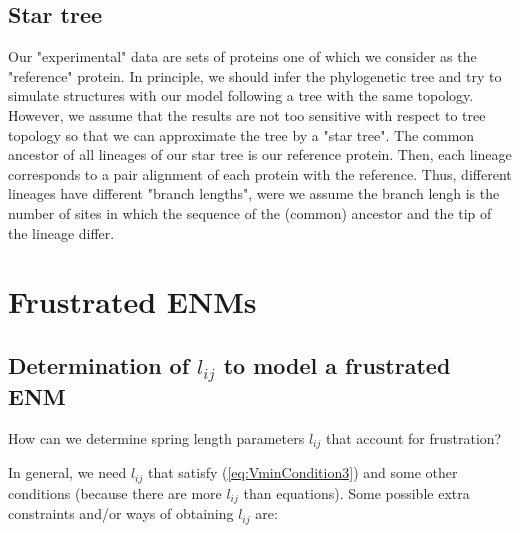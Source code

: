 \documentclass[12pt]{article}
\newcommand{\lij}{l_{ij}}
\begin{document}
\subsection{Star tree}

Our "experimental" data are sets of proteins one of which we consider as the "reference" protein. In principle, we should infer the phylogenetic tree and try to simulate structures with our model following a tree with the same topology. However, we assume that the results are not too sensitive with respect to tree topology so that we can approximate the tree by a "star tree". The common ancestor of all lineages of our star tree is our reference protein. Then, each lineage corresponds to a pair alignment of each protein with the reference. Thus, different lineages have different "branch lengths", were we assume the branch lengh is the number of sites in which the sequence of the (common) ancestor and the tip of the lineage differ. 

\cleardoublepage
\appendix

\section{Frustrated ENMs} \label{appendix:frustrated-enm}
\subsection{Determination of ${\lij}$ to model a frustrated ENM}
How can we determine spring length parameters $\lij$ that account for frustration?

In general, we need $\lij$ that satisfy (\ref{eq:VminCondition3}) and some other conditions (because there are  more $\lij$ than equations).  Some possible extra constraints and/or ways of obtaining $\lij$ are:
\end{document}

